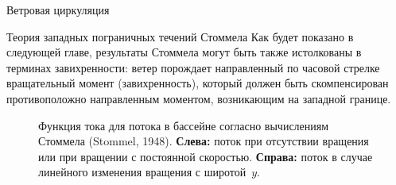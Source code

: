 \begin{chapter}{Ветровая циркуляция}
\begin{section}{Теория западных пограничных течений Стоммела}
Как будет показано в следующей главе, результаты Стоммела могут быть также
истолкованы в терминах завихренности: ветер порождает направленный по часовой
стрелке вращательный момент (завихренность), который должен быть скомпенсирован
противоположно направленным моментом, возникающим на западной границе.
%

\begin{figure}[h!]
\caption{Функция тока для потока в бассейне согласно вычислениям 
Стоммела (Stommel, 1948).  
\textbf{Слева:} поток при отсутствии вращения или при вращении с постоянной
скоростью. 
\textbf{Справа:} поток в случае линейного изменения вращения с широтой~$y$.}
\label{fig:stommelcurrents}
\end{figure}
%
\end{section}


\end{chapter}
